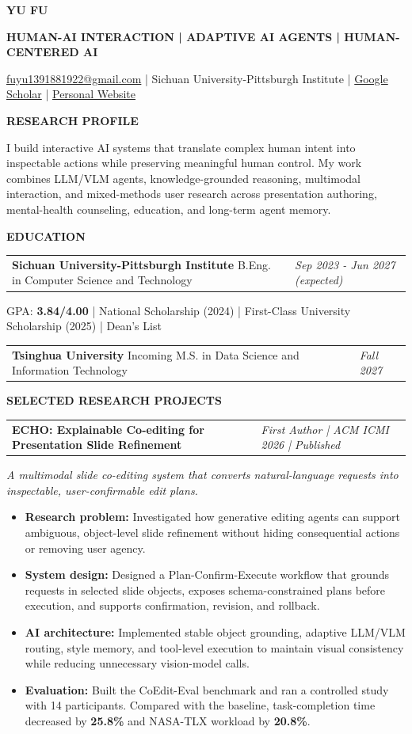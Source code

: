 \documentclass[10pt,a4paper]{article}
\makeatletter
\newcommand{\cvsection}[1]{%
  \vspace{0.65em}%
  \noindent
  {\color{navy}\fontsize{11.8}{13.2}\selectfont\bfseries\MakeUppercase{#1}}\par
  \vspace{0.09em}{\color{teal}\hrule height 0.7pt}\vspace{0.34em}%
}
\newcommand{\project}[2]{%
  \vspace{0.32em}%
  \begin{tabularx}{\textwidth}{@{}X>{\raggedleft\arraybackslash}p{5.35cm}@{}}
    {\color{navy}\fontsize{10.35}{11.6}\selectfont\bfseries #1} &
    {\color{muted}\fontsize{8.65}{10.1}\selectfont\itshape #2}
  \end{tabularx}%
  \vspace{-0.16em}%
}
\newcommand{\experience}[3]{%
  \vspace{0.25em}%
  \begin{tabularx}{\textwidth}{@{}X>{\raggedleft\arraybackslash}p{4.4cm}@{}}
    {\color{navy}\bfseries #1} {\color{muted}#2} &
    {\color{muted}\itshape #3}
  \end{tabularx}%
  \vspace{-0.18em}%
}
\newcommand{\summaryline}[1]{%
  {\color{muted}\fontsize{8.9}{10.6}\selectfont\itshape #1}\par\vspace{0.05em}%
}
\newcommand{\metric}[1]{{\color{teal}\bfseries #1}}
\makeatother
\begin{document}
\fontsize{9.25}{11.15}\selectfont

{\color{navy}\fontsize{25}{27}\selectfont\bfseries YU FU}\par
\vspace{0.12em}
{\color{teal}\fontsize{10.2}{11.5}\selectfont\bfseries
HUMAN-AI INTERACTION \;|\; ADAPTIVE AI AGENTS \;|\; HUMAN-CENTERED AI}
\par\vspace{0.25em}
\href{mailto:fuyu1391881922@gmail.com}{fuyu1391881922@gmail.com}
\quad | \quad Sichuan University-Pittsburgh Institute
\quad | \quad \href{https://scholar.google.com/citations?user=7_AhI5oAAAAJ&hl=en}{Google Scholar}
\quad | \quad \href{https://serinarica.github.io/fuyu/}{Personal Website}

\cvsection{Research Profile}
I build interactive AI systems that translate complex human intent into inspectable actions while preserving meaningful human control. My work combines LLM/VLM agents, knowledge-grounded reasoning, multimodal interaction, and mixed-methods user research across presentation authoring, mental-health counseling, education, and long-term agent memory.

\cvsection{Education}
\experience{Sichuan University-Pittsburgh Institute}{\; B.Eng. in Computer Science and Technology}{Sep 2023 - Jun 2027 (expected)}
GPA: \textbf{3.84/4.00} \quad | \quad National Scholarship (2024) \quad | \quad First-Class University Scholarship (2025) \quad | \quad Dean's List

\experience{Tsinghua University}{\; Incoming M.S. in Data Science and Information Technology}{Fall 2027}

\cvsection{Selected Research Projects}

\project{ECHO: Explainable Co-editing for Presentation Slide Refinement}{First Author | ACM ICMI 2026 | Published}
\summaryline{A multimodal slide co-editing system that converts natural-language requests into inspectable, user-confirmable edit plans.}
\begin{itemize}
  \item \textbf{Research problem:} Investigated how generative editing agents can support ambiguous, object-level slide refinement without hiding consequential actions or removing user agency.
  \item \textbf{System design:} Designed a Plan-Confirm-Execute workflow that grounds requests in selected slide objects, exposes schema-constrained plans before execution, and supports confirmation, revision, and rollback.
  \item \textbf{AI architecture:} Implemented stable object grounding, adaptive LLM/VLM routing, style memory, and tool-level execution to maintain visual consistency while reducing unnecessary vision-model calls.
  \item \textbf{Evaluation:} Built the CoEdit-Eval benchmark and ran a controlled study with 14 participants. Compared with the baseline, task-completion time decreased by \metric{25.8\%} and NASA-TLX workload by \metric{20.8\%}.
\end{itemize}
\end{document}
